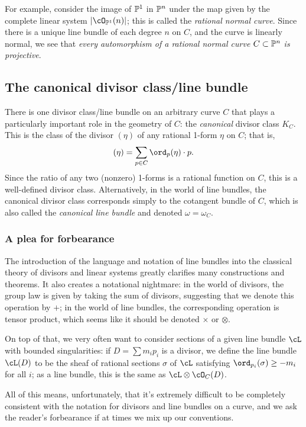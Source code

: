 For example, consider the image of $\PP^1$ in $\PP^n$ under the map given by the complete linear system $|\cO_{\PP^1}(n)|$; this is called the \emph{rational normal curve}. Since there is a unique line bundle of each degree $n$ on $C$, and the curve is linearly normal, we see that \emph{every automorphism of a rational normal curve $C \subset \PP^n$  is projective}.


\subsection{The canonical divisor class/line bundle}

There is one divisor class/line bundle on an arbitrary curve $C$ that plays a particularly important role in the geometry of $C$: the \emph{canonical} divisor class $K_C$. This is the class of the divisor $(\eta)$ of any rational 1-form $\eta$ on $C$; that is,
$$
(\eta) = \sum_{p \in C} \ord_p(\eta)\cdot p.
$$
Since the ratio of any two (nonzero) 1-forms is a rational function on $C$, this is a well-defined divisor class. Alternatively, in the world of line bundles, the canonical divisor class corresponds simply to the cotangent bundle of $C$, which is also called the \emph{canonical line bundle} and denoted $\omega = \omega_C$.

\subsubsection{A plea for forbearance} 

The introduction of the language and notation of line bundles into the classical theory of divisors and linear systems greatly clarifies many constructions and theorems. It also creates a notational nightmare: in the world of divisors, the group law is given by taking the sum of divisors, suggesting that we denote this operation by $+$; in the world of line bundles, the corresponding operation is tensor product, which seems like it should be denoted $\times$ or $\otimes$.

On top of that, we very often want to consider sections of a given line bundle $\cL$ with bounded singularities: if $D = \sum m_ip_i$ is a divisor, we define the line bundle $\cL(D)$ to be the sheaf of rational sections $\sigma$ of $\cL$ satisfying $\ord_{p_i}(\sigma) \geq -m_i$ for all $i$; as a line bundle, this is the same as $\cL \otimes \cO_C(D)$.

All of this means, unfortunately, that it's extremely difficult to be completely consistent with the notation for divisors and line bundles on a curve, and we ask the reader's forbearance if at times we mix up our conventions.




